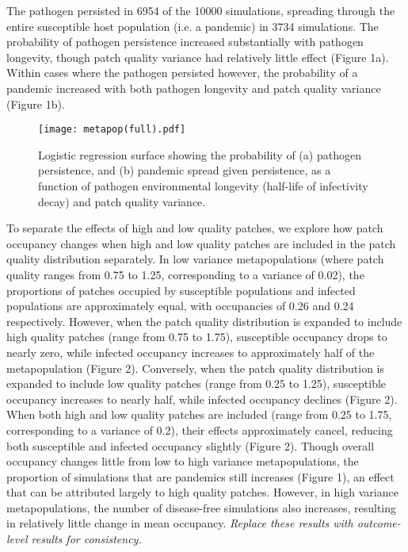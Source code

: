 \documentclass{svjour3}
\begin{document}
The pathogen persisted in 6954 of the 10000 simulations, spreading through the entire susceptible host population (i.e. a pandemic) in 3734 simulations.  The probability of pathogen persistence increased substantially with pathogen longevity, though patch quality variance had relatively little effect (Figure 1a).  Within cases where the pathogen persisted however, the probability of a pandemic increased with both pathogen longevity and patch quality variance (Figure 1b).

\begin{figure}
\label{poutcome}
\centering
\texttt{[image: metapop(full).pdf]}
\caption{Logistic regression surface showing the probability of (a) pathogen persistence, and (b) pandemic spread given persistence, as a function of pathogen environmental longevity (half-life of infectivity decay) and patch quality variance.}
\end{figure}   

To separate the effects of high and low quality patches, we explore how patch occupancy changes when high and low quality patches are included in the patch quality distribution separately.  In low variance metapopulations (where patch quality ranges from 0.75 to 1.25, corresponding to a variance of 0.02), the proportions of patches occupied by susceptible populations and infected populations are approximately equal, with occupancies of 0.26 and 0.24 respectively.  However, when the patch quality distribution is expanded to include high quality patches (range from 0.75 to 1.75), susceptible occupancy drops to nearly zero, while infected occupancy increases to approximately half of the metapopulation (Figure 2).  Conversely, when the patch quality distribution is expanded to include low quality patches (range from 0.25 to 1.25), susceptible occupancy increases to nearly half, while infected occupancy declines (Figure 2).  When both high and low quality patches are included (range from 0.25 to 1.75, corresponding to a variance of 0.2), their effects approximately cancel, reducing both susceptible and infected occupancy slightly (Figure 2).  Though overall occupancy changes little from low to high variance metapopulations, the proportion of simulations that are pandemics still increases (Figure 1), an effect that can be attributed largely to high quality patches.  However, in high variance metapopulations, the number of disease-free simulations also increases, resulting in relatively little change in mean occupancy.  \emph{Replace these results with outcome-level results for consistency.}
\end{document}

